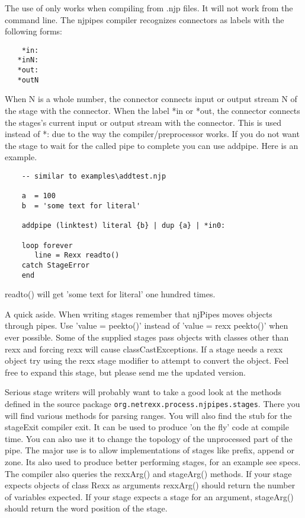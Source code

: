 The use of {} only works when compiling from .njp files.  It will not work from the command line.
The njpipes compiler recognizes connectors as labels with the following forms:
\begin{verbatim}
    *in:
   *inN:
   *out:
   *outN
\end{verbatim}

When N is a whole number, the connector connects input or output stream N of the stage with the connector.
When the label *in or *out, the connector connects the stages's current input or output stream with the connector.  This is used instead of *: due to the way the compiler/preprocessor works.
If you do not want the stage to wait for the called pipe to complete you can use addpipe.  Here is an example.
\begin{lstlisting}
    -- similar to examples\addtest.njp

    a  = 100
    b  = 'some text for literal'

    addpipe (linktest) literal {b} | dup {a} | *in0:

    loop forever
       line = Rexx readto()
    catch StageError
    end
\end{lstlisting}
    readto() will get 'some text for literal' one hundred times.

A quick aside.  When writing stages remember that njPipes moves objects through pipes.  Use 'value = peekto()' instead of 'value = rexx peekto()' when ever possible.  Some of the supplied stages pass objects with classes other than rexx and forcing rexx will cause classCastExceptions. If a stage needs a rexx object try using the rexx stage modifier to attempt to convert the object.  Feel free to expand this stage, but please send me the updated version.

Serious stage writers will probably want to take a good look at the
methods defined in the \nr{} source package \texttt{org.netrexx.process.njpipes.stages}.  There you will find various methods for parsing ranges.  You will also find the stub for the stageExit compiler exit.  It can be used to produce 'on the fly' code at compile time.  You can also use it to change the topology of the unprocessed part of the pipe.  The major use is to allow implementations of stages like prefix, append or zone.  Its also used to produce better performing stages, for an example see specs.
The compiler also queries the rexxArg() and stageArg() methods.  If your stage expects objects of class Rexx as arguments rexxArg() should return the number of variables expected.  If your stage expects a stage for an argument, stageArg() should return the word position of the stage.

